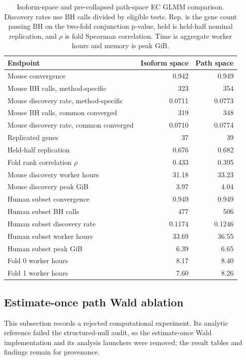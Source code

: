 \documentclass[11pt]{article}
\begin{document}
\begin{table}[H]
\centering
\scriptsize
\caption{Isoform-space and pre-collapsed path-space EC GLMM comparison. Discovery rates use BH calls divided by eligible tests. Rep. is the gene count passing BH on the two-fold conjunction p-value, held is held-half nominal replication, and \(\rho\) is fold Spearman correlation. Time is aggregate worker hours and memory is peak GiB.}
\label{tab:path-space-comparator}
\begin{tabular}{lrr}
\toprule
Endpoint & Isoform space & Path space\\
\midrule
Mouse convergence & 0.942 & 0.949\\
Mouse BH calls, method-specific & 323 & 354\\
Mouse discovery rate, method-specific & 0.0711 & 0.0773\\
Mouse BH calls, common converged & 319 & 348\\
Mouse discovery rate, common converged & 0.0710 & 0.0774\\
Replicated genes & 37 & 39\\
Held-half replication & 0.676 & 0.682\\
Fold rank correlation \(\rho\) & 0.433 & 0.395\\
Mouse discovery worker hours & 31.18 & 33.23\\
Mouse discovery peak GiB & 3.97 & 4.04\\
Human subset convergence & 0.949 & 0.949\\
Human subset BH calls & 477 & 506\\
Human subset discovery rate & 0.1174 & 0.1246\\
Human subset worker hours & 33.69 & 36.55\\
Human subset peak GiB & 6.39 & 6.65\\
Fold 0 worker hours & 8.17 & 8.40\\
Fold 1 worker hours & 7.60 & 8.26\\
\bottomrule
\end{tabular}
\end{table}

\subsection*{Estimate-once path Wald ablation}

This subsection records a rejected computational experiment. Its analytic reference failed the structured-null audit, so the estimate-once Wald implementation and its analysis launchers were removed; the result tables and findings remain for provenance.
\end{document}
